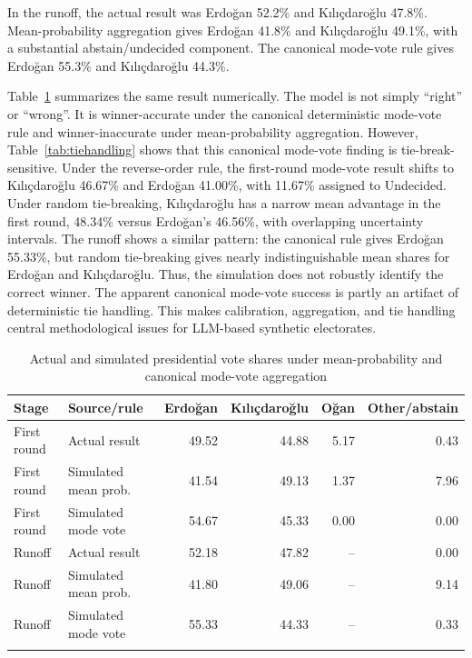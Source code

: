 \documentclass[pdflatex,sn-mathphys-num,iicol]{sn-jnl}
\begin{document}
In the runoff, the actual result was Erdoğan 52.2\% and Kılıçdaroğlu 47.8\%.
Mean-probability aggregation gives Erdoğan 41.8\% and Kılıçdaroğlu 49.1\%,
with a substantial abstain/undecided component. The canonical mode-vote rule
gives Erdoğan 55.3\% and Kılıçdaroğlu 44.3\%.

Table~\ref{tab:voteshares} summarizes the same result numerically. The model
is not simply ``right'' or ``wrong''. It is winner-accurate under the canonical
deterministic mode-vote rule and winner-inaccurate under mean-probability
aggregation. However, Table~\ref{tab:tiehandling} shows that this canonical
mode-vote finding is tie-break-sensitive. Under the reverse-order rule, the
first-round mode-vote result shifts to Kılıçdaroğlu 46.67\% and Erdoğan
41.00\%, with 11.67\% assigned to Undecided. Under random tie-breaking,
Kılıçdaroğlu has a narrow mean advantage in the first round, 48.34\% versus
Erdoğan's 46.56\%, with overlapping uncertainty intervals. The runoff shows a
similar pattern: the canonical rule gives Erdoğan 55.33\%, but random
tie-breaking gives nearly indistinguishable mean shares for Erdoğan and
Kılıçdaroğlu. Thus, the simulation does not robustly identify the correct
winner. The apparent canonical mode-vote success is partly an artifact of
deterministic tie handling. This makes calibration, aggregation, and tie
handling central methodological issues for LLM-based synthetic electorates.

\begin{table}[!htbp]
\caption{Actual and simulated presidential vote shares under mean-probability
and canonical mode-vote aggregation}
\label{tab:voteshares}
\centering
\begin{tabular}{@{}llrrrr@{}}
\toprule
Stage & Source/rule & Erdoğan & Kılıçdaroğlu & Oğan & Other/abstain \\
\midrule
First round & Actual result          & 49.52 & 44.88 & 5.17 & 0.43 \\
First round & Simulated mean prob.   & 41.54 & 49.13 & 1.37 & 7.96 \\
First round & Simulated mode vote    & 54.67 & 45.33 & 0.00 & 0.00 \\
\midrule
Runoff      & Actual result          & 52.18 & 47.82 &  --  & 0.00 \\
Runoff      & Simulated mean prob.   & 41.80 & 49.06 &  --  & 9.14 \\
Runoff      & Simulated mode vote    & 55.33 & 44.33 &  --  & 0.33 \\
\botrule
\end{tabular}
\end{table}
\end{document}
